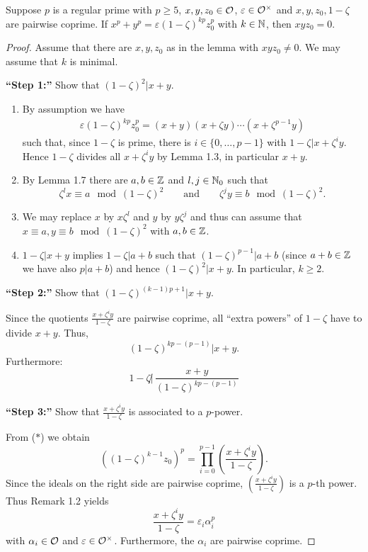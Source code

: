 \begin{Lem}
	Suppose $p$ is a regular prime with $p \geq 5$, $x,y,z_0 \in\mathcal{O}$, $\varepsilon \in \mathcal{O}^\times$ and $x,y,z_0, 1-\zeta $ are pairwise coprime.
	If $x^p + y^p = \varepsilon (1-\zeta)^{kp} z_0^p$
	with $k \in \mathbb{N}$, then $xyz_0 = 0$.
\end{Lem}


\begin{proof}
	Assume that there are $x,y,z_0$ as in the lemma with $xyz_0 \neq 0$.
	We may assume that $k$ is minimal.
	
	\bigskip \textbf{\enquote{Step 1:}}
	Show that $(1-\zeta)^2 | x+y$.
	
	\begin{enumerate}[(1)]
		\item By assumption we have
		\begin{align}
		\varepsilon (1-\zeta)^{kp} z_0^p
		= (x+y)(x+\zeta y) \cdots \left( x+\zeta^{p-1} y \right) \tag{$*$}
		\end{align}
		such that, since $1-\zeta$ is prime, there is $i \in \{ 0, \dots, p-1 \}$ with
		$1-\zeta | x+ \zeta^i y$.
		Hence $1-\zeta$ divides all $x+ \zeta^i y$ by Lemma 1.3, in particular $x+y$.
		\item By Lemma 1.7 there are $a,b \in \mathbb{Z}$ and $l,j \in\mathbb{N}_0$ such that
		\[ \zeta^l x \equiv a \mod (1-\zeta) ^2
		\qquad \text{and} \qquad
		\zeta^j y \equiv b \mod (1-\zeta) ^2.
		\]
		\item We may replace $x$ by $x\zeta^l$ and $y$ by $y\zeta^j$ and thus can assume that $x\equiv a, y \equiv b \mod (1-\zeta) ^2$ with $a,b\in \mathbb{Z}$.
		\item $1-\zeta | x+y$ implies $1-\zeta | a+b$ such that $(1-\zeta) ^{p-1} | a+b$ (since $a+b \in \mathbb{Z}$ we have also $p | a+b$) and hence $(1-\zeta)^2 | x+y$. In particular, $k \geq 2$.
	\end{enumerate}
	
	\bigskip \textbf{\enquote{Step 2:}}
	Show that $(1-\zeta)^{(k-1)p+1} | x+y$.
	
	Since the quotients $\frac{x+\zeta^i y}{1-\zeta}$ are pairwise coprime, all \enquote{extra powers} of $1-\zeta$ have to divide $x+y$. Thus,
	\[(1-\zeta)^{kp-(p-1)} | x+y.
	\]
	Furthermore: 
	\[ 1- \zeta \not | \, \frac{x+y}{(1-\zeta)^{kp-(p-1)}}
	\]
	
	\bigskip \textbf{\enquote{Step 3:}}
	Show that $\frac{x+\zeta^i y}{1-\zeta}$ is associated to a $p$-power.
	
	From ($*$) we obtain
	\[ \left( (1-\zeta)^{k-1} z_0 \right)^p
	= \prod_{i=0}^{p-1} \left( \frac{x+\zeta^i y}{1-\zeta} \right).
	\]
	Since the ideals on the right side are pairwise coprime, $ \left( \frac{x+\zeta^i y}{1-\zeta} \right)$ is a $p$-th power. Thus Remark 1.2 yields
	\[ \frac{x+\zeta^i y}{1-\zeta} = \varepsilon_i \alpha_i^p
	\]
	with $\alpha_i \in \mathcal{O}$ and $\varepsilon \in\mathcal{O}^\times$. Furthermore, the $\alpha_i$ are pairwise coprime.
	

\end{proof}
